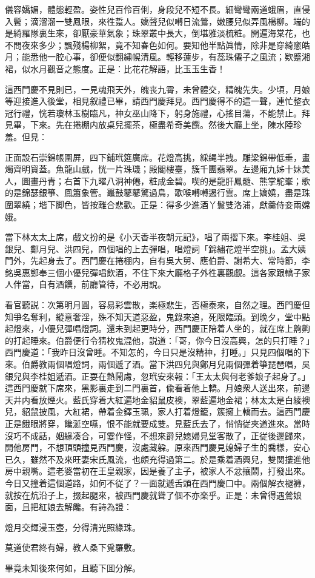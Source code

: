 \begin{myquote}
儀容嬌媚，體態輕盈。姿性兒百伶百俐，身段兒不短不長。細彎彎兩道蛾眉，直侵入鬢；滴溜溜一雙鳳眼，來徃踅人。嬌聲兒似囀日流鶯，嫩腰兒似弄風楊柳。端的是綺羅隊裏生來，卻厭豪華氣象；珠翠叢中長大，倒堪雅淡梳粧。開遍海棠花，也不問夜來多少；飄殘楊柳絮，竟不知春色如何。要知他半點眞情，除非是穿綺窻皓月；能悉他一腔心事，卻便似翻繡幌清風。輕移蓮步，有蕊珠僊子之風流；欵蹙湘裙，似水月觀音之態度。正是：比花花解語，比玉玉生香！
\end{myquote}

這西門慶不見則已，一見魂飛天外，魄丧九霄，未曾體交，精魄先失。少頃，月娘等迎接進入後堂，相見叙禮已畢，請西門慶拜見。西門慶得不的這一聲，連忙整衣冠行禮，恍若瓊林玉樹臨凡，神女巫山降下，躬身施禮，心搖目蕩，不能禁止。拜見畢，下來。先在捲棚内放桌兒擺茶，極盡希奇美饌。然後大廳上坐，陳水陸珍羞。但見：

\begin{myquote}
正面設石崇錦帳圍屏，四下鋪玳筵廣席。花燈高挑，綵䋲半拽。雕梁錦帶低垂，畫燭齊明寳蓋。魚龍山戲，恍一片珠璣；殿閣樓臺，簇千團翡翠。左邊廂九姊十妹羙人，圖畫丹青；右首下九曜八洞神僊，粧成金碧。喫的是龍肝鳳髓、熊掌駝峯；歌的是錦瑟銀箏、鳳簫象管。鼉鼓鼕鼕驚過鳥，歌喉囀囀遏行雲。席上嬌嬈，盡是珠圍翠繞；堦下脚色，皆按離合悲歡。正是：得多少進酒丫鬟雙洛浦，獻羹侍妾兩嫦娥。
\end{myquote}

當下林太太上席，戲文扮的是《小天香半夜朝元記》，唱了兩摺下來。李桂姐、吳銀兒、鄭月兒、洪四兒，四個唱的上去彈唱，唱燈詞「錦繡花燈半空挑」。孟大姨門外，先起身去了。西門慶在捲棚内，自有吳大舅、應伯爵、謝希大、常時節，李銘吳惠鄭奉三個小優兒彈唱飲酒，不住下來大廳格子外徃裏觀覷。這各家跟轎子家人伴當，自有酒饌，前廳管待，不必用說。

看官聽説：次第明月圓，容易彩雲散，楽極悲生，否極泰來，自然之理。西門慶但知爭名奪利，縱意奢淫，殊不知天道惡盈，鬼錄來追，死限臨頭。到晚夕，堂中點起燈來，小優兒彈唱燈詞。還未到起更時分，西門慶正陪着人坐的，就在席上齁齁的打起睡來。伯爵便行令猜枚鬼混他，説道：「哥，你今日沒高興，怎的只打睡？」西門慶道：「我昨日沒曾睡。不知怎的，今日只是沒精神，打睡。」只見四個唱的下來。伯爵教兩個唱燈詞，兩個遞了酒。當下洪四兒與鄭月兒兩個彈着箏琵琶唱，吳銀兒與李桂姐遞酒。正耍在熱鬧䖏，忽玳安來報：「王太太與何老爹娘子起身了。」這西門慶就下席來，黑影裏走到二門裏首，偸看着他上轎。月娘衆人送出來，前邊天井内看放煙火。藍氏穿着大紅遍地金貂鼠皮襖，翠藍遍地金裙；林太太是白綾襖兒，貂鼠披風，大紅裙，帶着金鐸玉珮，家人打着燈籠，簇擁上轎而去。這西門慶正是餓眼將穿，饞涎空嚥，恨不能就要成雙。見藍氏去了，悄悄従夾道進來。當時沒巧不成話，姻緣凑合，可霎作怪，不想來爵兒媳婦見堂客散了，正従後邊歸來，開他房門，不想頂頭撞見西門慶，沒處藏躱。原來西門慶見媳婦子生的喬樣，安心已久，雖然不及來旺妻宋氏風流，也頗充得過第二。於是乘着酒興兒，雙関摟進他房中親嘴。這老婆當初在王皇親家，因是養了主子，被家人不忿攘鬧，打發出來。今日又撞着這個道路，如何不従了？一面就遞舌頭在西門慶口中。兩個解衣褪褲，就按在炕沿子上，掇起腿來，被西門慶就聳了個不亦楽乎。正是：未曾得遇鶯娘面，且把紅娘去解饞。有詩為證：

\begin{myquote}
燈月交輝浸玉壺，分得清光照綠珠。

莫道使君終有婦，教人桑下覓羅敷。
\end{myquote}

畢竟未知後來何如，且聽下囬分解。

